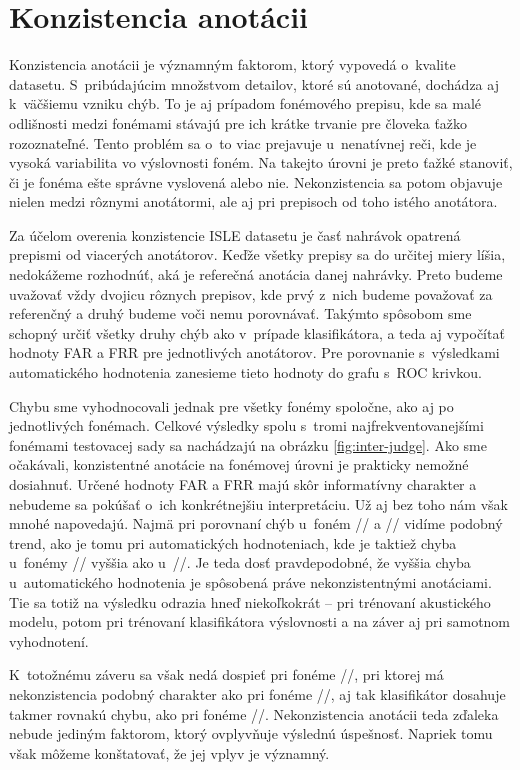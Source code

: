\section{Konzistencia anotácii}

Konzistencia anotácii je významným faktorom, ktorý vypovedá o~kvalite datasetu. S~pribúdajúcim množstvom detailov, ktoré sú anotované, dochádza aj k~väčšiemu vzniku chýb. To je aj prípadom fonémového prepisu, kde sa malé odlišnosti medzi fonémami stávajú pre ich krátke trvanie pre človeka ťažko rozoznateľné. Tento problém sa o~to viac prejavuje u~nenatívnej reči, kde je vysoká variabilita vo výslovnosti foném. Na takejto úrovni je preto ťažké stanoviť, či je fonéma ešte správne vyslovená alebo nie. Nekonzistencia sa potom objavuje nielen medzi rôznymi anotátormi, ale aj pri prepisoch od toho istého anotátora.

Za účelom overenia konzistencie ISLE datasetu je časť nahrávok opatrená prepismi od viacerých anotátorov. Keďže všetky prepisy sa do určitej miery líšia, nedokážeme rozhodnúť, aká je referečná anotácia danej nahrávky. Preto budeme uvažovať vždy dvojicu rôznych prepisov, kde prvý z~nich budeme považovať za referenčný a druhý budeme voči nemu porovnávať. Takýmto spôsobom sme schopný určiť všetky druhy chýb ako v~prípade klasifikátora, a teda aj vypočítať hodnoty FAR a FRR pre jednotlivých anotátorov. Pre porovnanie s~výsledkami automatického hodnotenia zanesieme tieto hodnoty do grafu s~ROC krivkou.

Chybu sme vyhodnocovali jednak pre všetky fonémy spoločne, ako aj po jednotlivých fonémach. Celkové výsledky spolu s~tromi najfrekventovanejšími fonémami testovacej sady sa nachádzajú na obrázku \ref{fig:inter-judge}. Ako sme očakávali, konzistentné anotácie na fonémovej úrovni je prakticky nemožné dosiahnuť. 
Určené hodnoty FAR a FRR majú skôr informatívny charakter a nebudeme sa pokúšať o~ich konkrétnejšiu interpretáciu. Už aj bez toho nám však mnohé napovedajú.  Najmä pri porovnaní chýb u~foném // a // vidíme podobný trend, ako je tomu pri automatických hodnoteniach, kde je taktiež chyba u~fonémy // vyššia ako u~//. Je teda dosť pravdepodobné, že vyššia chyba u~automatického hodnotenia je spôsobená práve nekonzistentnými anotáciami. Tie sa totiž na výsledku odrazia hneď niekoľkokrát -- pri trénovaní akustického modelu, potom pri trénovaní klasifikátora výslovnosti a na záver aj pri samotnom vyhodnotení.

K~totožnému záveru sa však nedá dospieť pri fonéme //, pri ktorej má nekonzistencia podobný charakter ako pri fonéme //, aj tak klasifikátor dosahuje takmer rovnakú chybu, ako pri fonéme //. Nekonzistencia anotácii teda zďaleka nebude jediným faktorom, ktorý ovplyvňuje výslednú úspešnosť. Napriek tomu však môžeme konštatovať, že jej vplyv je významný. 



